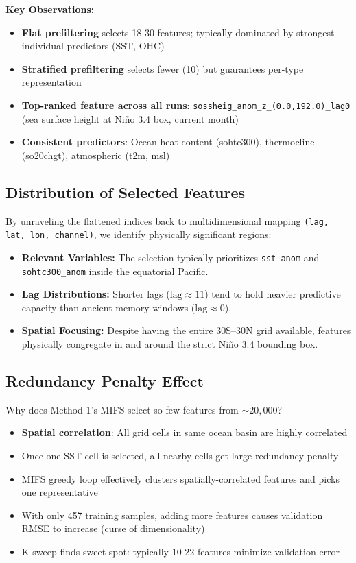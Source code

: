 \textbf{Key Observations:}
\begin{itemize}
\item \textbf{Flat prefiltering} selects 18-30 features; typically dominated by strongest individual predictors (SST, OHC)
\item \textbf{Stratified prefiltering} selects fewer (10) but guarantees per-type representation
\item \textbf{Top-ranked feature across all runs}: \texttt{sossheig\_anom\_z\_(0.0,192.0)\_lag0} (sea surface height at Ni\~{n}o 3.4 box, current month)
\item \textbf{Consistent predictors}: Ocean heat content (sohtc300), thermocline (so20chgt), atmospheric (t2m, msl)
\end{itemize}

\subsection{Distribution of Selected Features}
By unraveling the flattened indices back to multidimensional mapping \texttt{(lag, lat, lon, channel)}, we identify physically significant regions:
\begin{itemize}
\item \textbf{Relevant Variables:} The selection typically prioritizes \texttt{sst\_anom} and \texttt{sohtc300\_anom} inside the equatorial Pacific.
\item \textbf{Lag Distributions:} Shorter lags ($\text{lag} \approx 11$) tend to hold heavier predictive capacity than ancient memory windows ($\text{lag} \approx 0$).
\item \textbf{Spatial Focusing:} Despite having the entire 30\degree S--30\degree N grid available, features physically congregate in and around the strict Ni\~{n}o 3.4 bounding box.
\end{itemize}

\subsection{Redundancy Penalty Effect}
Why does Method 1's MIFS select so few features from $\sim 20,000$?
\begin{itemize}
\item \textbf{Spatial correlation}: All grid cells in same ocean basin are highly correlated
\item Once one SST cell is selected, all nearby cells get large redundancy penalty
\item MIFS greedy loop effectively clusters spatially-correlated features and picks one representative
\item With only 457 training samples, adding more features causes validation RMSE to increase (curse of dimensionality)
\item K-sweep finds sweet spot: typically 10-22 features minimize validation error
\end{itemize}

